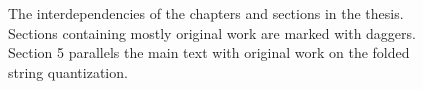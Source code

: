 \begin{figure}[h]
\caption[The interdependencies of the chapters and sections in the thesis]{The interdependencies of the chapters and sections in the thesis. Sections containing mostly original work are marked with daggers. Section 5 parallels the main text with original work on the folded string quantization.}
\label{fig:chapters}
\end{figure}
 
 
 
 
 
 
